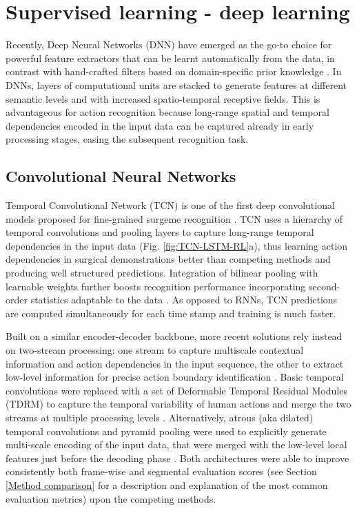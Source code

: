 \documentclass[journal]{IEEEtran}
\begin{document}
\section{Supervised learning - deep learning} \label{Deep Learning}

Recently, Deep Neural Networks (DNN) have emerged as the go-to choice for powerful feature extractors that can be learnt automatically from the data, in contrast with hand-crafted filters based on domain-specific prior knowledge \cite{deepVStrad2019}. In DNNs, layers of computational units are stacked to generate features at different semantic levels and with increased spatio-temporal receptive fields. This is advantageous for action recognition because long-range spatial and temporal dependencies encoded in the input data can be captured already in early processing stages, easing the subsequent recognition task.

\subsection{Convolutional Neural Networks}

Temporal Convolutional Network (TCN) is one of the first deep convolutional models proposed for fine-grained surgeme recognition \cite{Lea2016tcnECCV}.
TCN uses a hierarchy of temporal convolutions and pooling layers to capture long-range temporal dependencies in the input data (Fig. \ref{fig:TCN-LSTM-RL}a), thus learning action dependencies in surgical demonstrations better than competing methods and producing well structured predictions.
Integration of bilinear pooling with learnable weights further boosts recognition performance incorporating second-order statistics adaptable to the data \cite{Zhang2019}.
As opposed to RNNs, TCN predictions are computed simultaneously for each time stamp and training is much faster. 


Built on a similar encoder-decoder backbone, more recent solutions rely instead on two-stream processing: one stream to capture multiscale contextual information and action dependencies in the input sequence, the other to extract low-level information for precise action boundary identification \cite{Lei2018, Wang2019}. 
Basic temporal convolutions were replaced with a set of Deformable Temporal Residual Modules (TDRM) to capture the temporal variability of human actions and merge the two streams at multiple processing levels \cite{Lei2018}.
Alternatively, atrous (aka dilated) temporal convolutions and pyramid pooling were used to explicitly generate multi-scale encoding of the input data, that were merged with the low-level local features just before the decoding phase \cite{Wang2019}. 
Both architectures were able to improve consistently both frame-wise and segmental evaluation scores (see Section \ref{Method comparison} for a description and explanation of the most common evaluation metrics) upon the competing methods.
\end{document}

